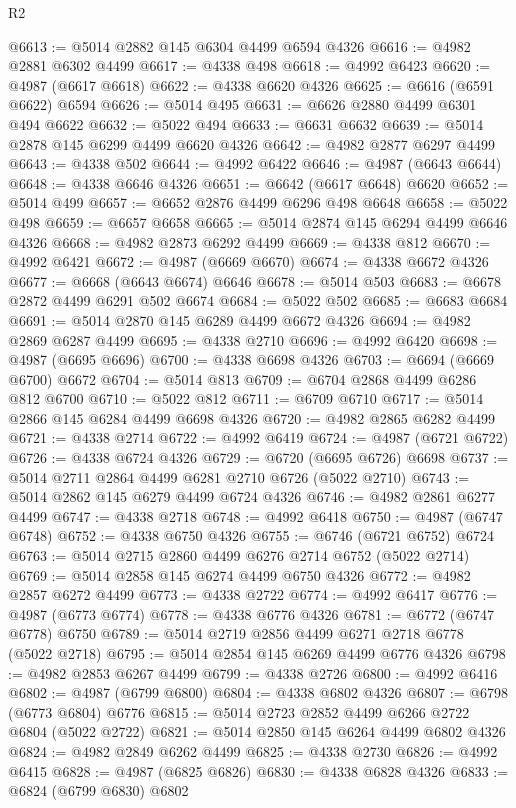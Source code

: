 \begin{lexlean}{R2}
\begin{coremodule}
@6613 := @5014 @2882 @145 @6304 @4499 @6594 @4326
@6616 := @4982 @2881 @6302 @4499
@6617 := @4338 @498
@6618 := @4992 @6423
@6620 := @4987 (@6617 @6618)
@6622 := @4338 @6620 @4326
@6625 := @6616 (@6591 @6622) @6594
@6626 := @5014 @495
@6631 := @6626 @2880 @4499 @6301 @494 @6622
@6632 := @5022 @494
@6633 := @6631 @6632
@6639 := @5014 @2878 @145 @6299 @4499 @6620 @4326
@6642 := @4982 @2877 @6297 @4499
@6643 := @4338 @502
@6644 := @4992 @6422
@6646 := @4987 (@6643 @6644)
@6648 := @4338 @6646 @4326
@6651 := @6642 (@6617 @6648) @6620
@6652 := @5014 @499
@6657 := @6652 @2876 @4499 @6296 @498 @6648
@6658 := @5022 @498
@6659 := @6657 @6658
@6665 := @5014 @2874 @145 @6294 @4499 @6646 @4326
@6668 := @4982 @2873 @6292 @4499
@6669 := @4338 @812
@6670 := @4992 @6421
@6672 := @4987 (@6669 @6670)
@6674 := @4338 @6672 @4326
@6677 := @6668 (@6643 @6674) @6646
@6678 := @5014 @503
@6683 := @6678 @2872 @4499 @6291 @502 @6674
@6684 := @5022 @502
@6685 := @6683 @6684
@6691 := @5014 @2870 @145 @6289 @4499 @6672 @4326
@6694 := @4982 @2869 @6287 @4499
@6695 := @4338 @2710
@6696 := @4992 @6420
@6698 := @4987 (@6695 @6696)
@6700 := @4338 @6698 @4326
@6703 := @6694 (@6669 @6700) @6672
@6704 := @5014 @813
@6709 := @6704 @2868 @4499 @6286 @812 @6700
@6710 := @5022 @812
@6711 := @6709 @6710
@6717 := @5014 @2866 @145 @6284 @4499 @6698 @4326
@6720 := @4982 @2865 @6282 @4499
@6721 := @4338 @2714
@6722 := @4992 @6419
@6724 := @4987 (@6721 @6722)
@6726 := @4338 @6724 @4326
@6729 := @6720 (@6695 @6726) @6698
@6737 := @5014 @2711 @2864 @4499 @6281 @2710 @6726 (@5022 @2710)
@6743 := @5014 @2862 @145 @6279 @4499 @6724 @4326
@6746 := @4982 @2861 @6277 @4499
@6747 := @4338 @2718
@6748 := @4992 @6418
@6750 := @4987 (@6747 @6748)
@6752 := @4338 @6750 @4326
@6755 := @6746 (@6721 @6752) @6724
@6763 := @5014 @2715 @2860 @4499 @6276 @2714 @6752 (@5022 @2714)
@6769 := @5014 @2858 @145 @6274 @4499 @6750 @4326
@6772 := @4982 @2857 @6272 @4499
@6773 := @4338 @2722
@6774 := @4992 @6417
@6776 := @4987 (@6773 @6774)
@6778 := @4338 @6776 @4326
@6781 := @6772 (@6747 @6778) @6750
@6789 := @5014 @2719 @2856 @4499 @6271 @2718 @6778 (@5022 @2718)
@6795 := @5014 @2854 @145 @6269 @4499 @6776 @4326
@6798 := @4982 @2853 @6267 @4499
@6799 := @4338 @2726
@6800 := @4992 @6416
@6802 := @4987 (@6799 @6800)
@6804 := @4338 @6802 @4326
@6807 := @6798 (@6773 @6804) @6776
@6815 := @5014 @2723 @2852 @4499 @6266 @2722 @6804 (@5022 @2722)
@6821 := @5014 @2850 @145 @6264 @4499 @6802 @4326
@6824 := @4982 @2849 @6262 @4499
@6825 := @4338 @2730
@6826 := @4992 @6415
@6828 := @4987 (@6825 @6826)
@6830 := @4338 @6828 @4326
@6833 := @6824 (@6799 @6830) @6802

\end{coremodule}
\end{lexlean}
